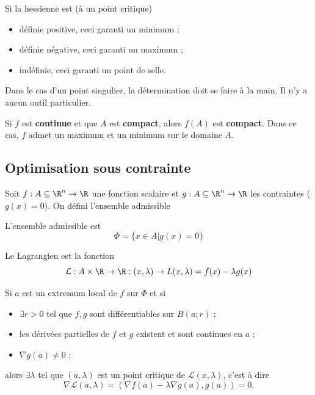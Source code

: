\begin{myprop}
	Si la hessienne est (à un point critique)
	\begin{itemize}
		\item définie positive, ceci garanti un minimum ;
		\item définie négative, ceci garanti un maximum ;
		\item indéfinie, ceci garanti un point de selle.
	\end{itemize}
\end{myprop}

\begin{myprop}
	Dans le cas d'un point singulier, la détermination doit se faire à la main. Il n'y a aucun outil particulier.
\end{myprop}

\begin{mytheo}
	Si $f$ est \textbf{continue} et que $A$ est \textbf{compact}, alors $f(A)$ est \textbf{compact}. Dans ce cas, $f$ admet un maximum et un minimum sur le domaine $A$.
\end{mytheo}

\subsection{Optimisation sous contrainte}

Soit $f : A \subseteq \R^n \to \R$ une fonction scalaire et $g : A \subseteq \R^n \to \R$ les contraintes ($g(x) = 0$). On défini l'ensemble admissible

\begin{mydef} L'ensemble admissible est
	\[ \Phi = \{ x \in A | g(x) = 0 \} \]
\end{mydef}

\begin{mydef}[Lagrangien] Le Lagrangien est la fonction
	\[ \mathcal{L} : A \times \R \to \R : (x, \lambda) \to L(x, \lambda) = f(x) - \lambda g(x) \]
\end{mydef}

\begin{myprop}
	Si $a$ est un extremum local de $f$ sur $\Phi$ et si
	\begin{itemize}
		\item $\exists r >0$ tel que $f, g$ sont différentiables
			sur $B(a;r)$ ;
		\item les dérivées partielles de $f$ et $g$ existent et sont continues en $a$ ;
		\item $\nabla g(a) \neq 0$ ;
	\end{itemize}
	alors $\exists \lambda$ tel que $(a,\lambda)$ est un point critique de $\mathcal{L}(x,\lambda)$, c'est à dire
	\[ \nabla \mathcal{L}(a,\lambda) = (\nabla f(a) - \lambda\nabla g(a), g(a)) = 0 .\]
\end{myprop}

